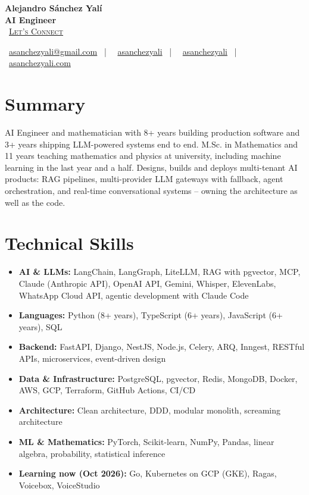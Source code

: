 \documentclass[letterpaper,10pt]{article}
\newcommand{\normalfaCalendar}{{\mdseries\faCalendar}}
\newcommand{\normalfaEnvelope}{{\mdseries\faEnvelope}}
\newcommand{\normalfaLinkedin}{{\mdseries\faLinkedin}}
\newcommand{\normalfaGithub}{{\mdseries\faGithub}}
\newcommand{\normalfaGlobe}{{\mdseries\faGlobe}}
\begin{document}
\begin{center}
\textbf{\LARGE Alejandro S\'anchez Yal\'i}\\[0.2em]
\textbf{\Large AI Engineer}\\[0.4em]
\small
\normalfaCalendar\ \href{https://cal.com/asanchezyali/full-time-opportunities}{\textsc{Let's Connect}}

\vspace{0.5em}
\normalfaEnvelope\ \href{mailto:asanchezyali@gmail.com}{asanchezyali@gmail.com}  ~|~
\normalfaLinkedin\ \href{https://www.linkedin.com/in/asanchezyali}{asanchezyali} ~|~
\normalfaGithub\ \href{https://github.com/asanchezyali}{asanchezyali}  ~|~
\normalfaGlobe\ \href{https://asanchezyali.com}{asanchezyali.com}
\end{center}


\section{Summary}
AI Engineer and mathematician with 8+ years building production software and 3+ years shipping LLM-powered systems end to end. M.Sc. in Mathematics and 11 years teaching mathematics and physics at university, including machine learning in the last year and a half. Designs, builds and deploys multi-tenant AI products: RAG pipelines, multi-provider LLM gateways with fallback, agent orchestration, and real-time conversational systems -- owning the architecture as well as the code.

\section{Technical Skills}
\begin{itemize}[leftmargin=*, itemsep=0pt]
  \item \textbf{AI \& LLMs:} LangChain, LangGraph, LiteLLM, RAG with pgvector, MCP, Claude (Anthropic API), OpenAI API, Gemini, Whisper, ElevenLabs, WhatsApp Cloud API, agentic development with Claude Code
  \item \textbf{Languages:} Python (8+ years), TypeScript (6+ years), JavaScript (6+ years), SQL
  \item \textbf{Backend:} FastAPI, Django, NestJS, Node.js, Celery, ARQ, Inngest, RESTful APIs, microservices, event-driven design
  \item \textbf{Data \& Infrastructure:} PostgreSQL, pgvector, Redis, MongoDB, Docker, AWS, GCP, Terraform, GitHub Actions, CI/CD
  \item \textbf{Architecture:} Clean architecture, DDD, modular monolith, screaming architecture
  \item \textbf{ML \& Mathematics:} PyTorch, Scikit-learn, NumPy, Pandas, linear algebra, probability, statistical inference
  \item \textbf{Learning now (Oct 2026):} Go, Kubernetes on GCP (GKE), Ragas, Voicebox, VoiceStudio
\end{itemize}
\end{document}
